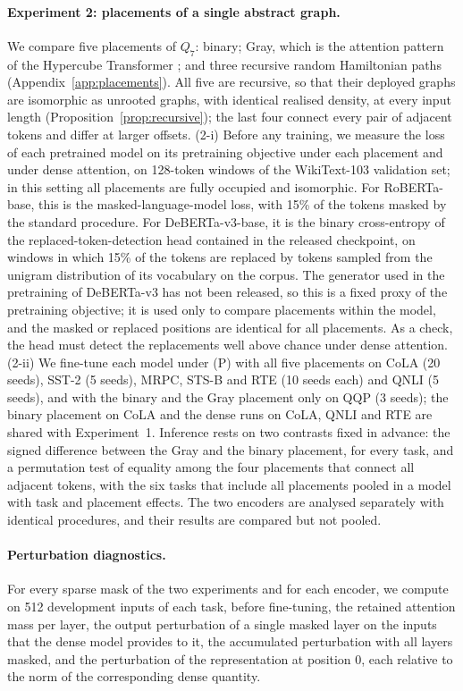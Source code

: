 \documentclass[10pt]{article}
\begin{document}
\paragraph{Experiment 2: placements of a single abstract graph.} We compare five placements of $Q_7$: binary; Gray, which is the attention pattern of the Hypercube Transformer \citep{wang2022dense}; and three recursive random Hamiltonian paths (Appendix~\ref{app:placements}). All five are recursive, so that their deployed graphs are isomorphic as unrooted graphs, with identical realised density, at every input length (Proposition~\ref{prop:recursive}); the last four connect every pair of adjacent tokens and differ at larger offsets. (2-i) Before any training, we measure the loss of each pretrained model on its pretraining objective under each placement and under dense attention, on 128-token windows of the WikiText-103 validation set; in this setting all placements are fully occupied and isomorphic. For RoBERTa-base, this is the masked-language-model loss, with 15\% of the tokens masked by the standard procedure. For DeBERTa-v3-base, it is the binary cross-entropy of the replaced-token-detection head contained in the released checkpoint, on windows in which 15\% of the tokens are replaced by tokens sampled from the unigram distribution of its vocabulary on the corpus. The generator used in the pretraining of DeBERTa-v3 has not been released, so this is a fixed proxy of the pretraining objective; it is used only to compare placements within the model, and the masked or replaced positions are identical for all placements. As a check, the head must detect the replacements well above chance under dense attention. (2-ii) We fine-tune each model under (P) with all five placements on CoLA (20 seeds), SST-2 (5 seeds), MRPC, STS-B and RTE (10 seeds each) and QNLI (5 seeds), and with the binary and the Gray placement only on QQP (3 seeds); the binary placement on CoLA and the dense runs on CoLA, QNLI and RTE are shared with Experiment~1. Inference rests on two contrasts fixed in advance: the signed difference between the Gray and the binary placement, for every task, and a permutation test of equality among the four placements that connect all adjacent tokens, with the six tasks that include all placements pooled in a model with task and placement effects. The two encoders are analysed separately with identical procedures, and their results are compared but not pooled.

\paragraph{Perturbation diagnostics.} For every sparse mask of the two experiments and for each encoder, we compute on 512 development inputs of each task, before fine-tuning, the retained attention mass per layer, the output perturbation of a single masked layer on the inputs that the dense model provides to it, the accumulated perturbation with all layers masked, and the perturbation of the representation at position 0, each relative to the norm of the corresponding dense quantity.
\end{document}
